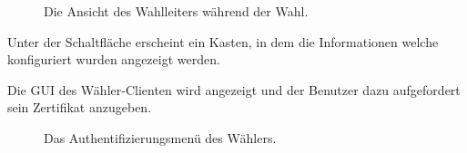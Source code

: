 \documentclass[parskip=full]{scrartcl}
\begin{document}
\begin{figure}[h!]
	\caption{\label{fig:sup_result}
		Die Ansicht des Wahlleiters während der Wahl.
	}
\end{figure}


		{Unter der Schaltfläche erscheint ein Kasten, in dem die Informationen welche konfiguriert wurden angezeigt werden.}

		{Die GUI des Wähler-Clienten wird angezeigt und der Benutzer dazu aufgefordert sein Zertifikat anzugeben.}

\begin{figure}[h!]
	\caption{\label{fig:vot_authentication}
		Das Authentifizierungsmenü des Wählers.
	}
\end{figure}
\end{document}

